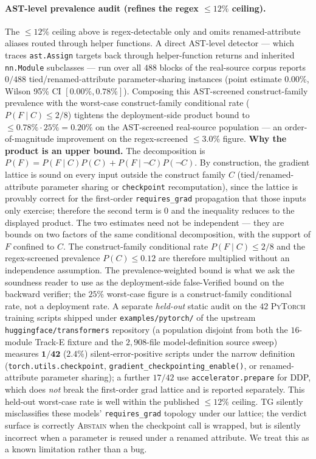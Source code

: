 \paragraph{AST-level prevalence audit (refines the regex
$\le 12\%$ ceiling).}
The $\le 12\%$ ceiling above is regex-detectable only and
omits renamed-attribute aliases routed through helper
functions. A direct AST-level detector --- which traces
\texttt{ast.Assign} targets back through helper-function
returns and inherited \texttt{nn.Module} subclasses --- run
over all $488$ blocks of the real-source corpus reports
$0/488$ tied/renamed-attribute parameter-sharing instances
(point estimate $0.00\%$, Wilson 95\% CI
$[0.00\%, 0.78\%]$). Composing this AST-screened
construct-family prevalence with the worst-case construct-family
conditional rate ($P(F\!\mid\!C)\!\le\!2/8$) tightens the
deployment-side product bound to $\le 0.78\%\!\cdot\!25\% =
\mathbf{0.20\%}$ on the AST-screened real-source population
--- an order-of-magnitude improvement on the regex-screened
$\le 3.0\%$ figure.
\textbf{Why the product is an upper bound.} The decomposition is
$P(F)=P(F\!\mid\!C)P(C)+P(F\!\mid\!\neg C)P(\neg C)$. By
construction, the gradient lattice is sound on every input outside
the construct family $C$ (tied/renamed-attribute parameter sharing
or \texttt{checkpoint} recomputation), since the lattice is
provably correct for the first-order \texttt{requires\_grad}
propagation that those inputs only exercise; therefore the second
term is $0$ and the inequality reduces to the displayed product.
The two estimates need not be independent --- they are bounds on
two factors of the same conditional decomposition, with the
support of $F$ confined to $C$. The construct-family conditional
rate $P(F\!\mid\!C)\!\le\!2/8$ and the regex-screened prevalence
$P(C)\!\le\!0.12$ are therefore multiplied without an
independence assumption. The
prevalence-weighted bound is what we ask the soundness reader
to use as the deployment-side false-Verified bound on the
backward verifier; the $25\%$ worst-case figure is a
construct-family conditional rate, not a deployment rate. A separate \emph{held-out} static audit on the
$42$ \textsc{PyTorch} training scripts shipped under
\texttt{examples/pytorch/} of the upstream
\texttt{huggingface/transformers} repository (a population
disjoint from both the $16$-module Track-E fixture and the
$2{,}908$-file model-definition source sweep) measures
$\mathbf{1/42}$ ($\mathbf{2.4\%}$) silent-error-positive scripts
under the narrow definition (\texttt{torch.utils.checkpoint},
\texttt{gradient\_checkpointing\_enable()}, or renamed-attribute
parameter sharing); a further $17/42$ use
\texttt{accelerator.prepare} for DDP, which does \emph{not}
break the first-order grad lattice and is reported separately.
This held-out worst-case rate is well within the published
$\le 12\%$ ceiling. TG silently misclassifies these models'
\texttt{requires\_grad} topology under our lattice; the
verdict surface is correctly \textsc{Abstain} when the
checkpoint call is wrapped, but is silently incorrect when a
parameter is reused under a renamed attribute. We treat this
as a known limitation rather than a bug.


